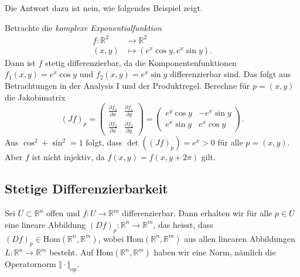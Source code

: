\documentclass[../main.tex]{subfiles}
\begin{document}
Die Antwort dazu ist nein, wie folgendes Beispiel zeigt.

\begin{example}
  Betrachte die \emph{komplexe Exponentialfunktion}
  \begin{align*}
    f \colon \mathbb{R}^2 & \to \mathbb{R}^2 \\
    (x, y) & \mapsto (e^{x} \cos y, e^x \sin y).
  \end{align*}
  Dann ist $f$ stetig differenzierbar, da die Komponentenfunktionen
  $f_1(x, y) = e^{x} \cos y$ und $f_2(x, y) = e^x \sin y$ 
  differenzierbar sind. Das folgt aus Betrachtungen in
  der Analysis I und der Produktregel.
  Berechne für $p = (x, y)$ die Jakobimatrix
  \[
    {(Jf)}_p =
    \begin{pmatrix}
      \frac{\partial f_1}{\partial x} & \frac{\partial f_1}{\partial y} \\
      \frac{\partial f_2}{\partial x} & \frac{\partial f_2}{\partial y}
    \end{pmatrix}
    =
    \begin{pmatrix}
      e^y \cos y & - e^x \sin y \\
      e^x \sin y & e^x \cos y
    \end{pmatrix}.
  \]
  Aus $\cos^2 + \sin^2 = 1$ folgt, dass $\det({(Jf)}_p) = e^x > 0$ 
  für alle $p = (x, y)$.
  Aber $f$ ist nicht injektiv, da $f(x, y) = f(x, y + 2 \pi)$ gilt.
\end{example}

\subsection*{Stetige Differenzierbarkeit}
Sei $U \subset \mathbb{R}^n$ offen und
$f \colon U \to \mathbb{R}^m$ differenzierbar.
Dann erhalten wir für alle $p \in U$ eine lineare
Abbildung ${(Df)}_p \colon \mathbb{R}^n \to \mathbb{R}^m$,
das heisst, dass ${(Df)}_p \in \text{Hom}(\mathbb{R}^n, \mathbb{R}^m)$,
wobei $\text{Hom}(\mathbb{R}^n, \mathbb{R}^m)$ aus
allen linearen Abbildungen $L \colon \mathbb{R}^n \to \mathbb{R}^m$ besteht.
Auf $\text{Hom}(\mathbb{R}^n, \mathbb{R}^m)$ haben wir
eine Norm, nämlich die Operatornorm $\Vert \cdot \Vert_{\text{op}}$.
\end{document}
